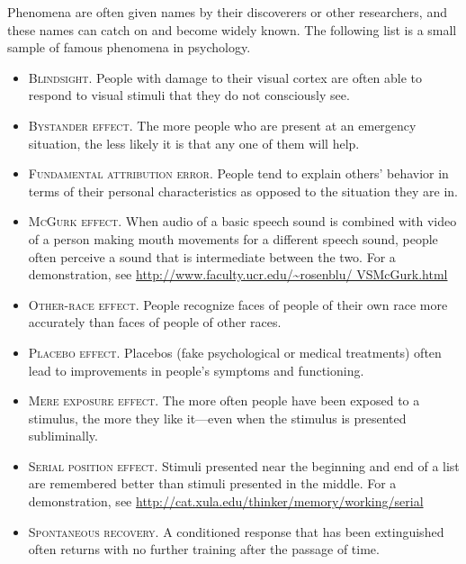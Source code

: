  Phenomena are often given names by their discoverers or other researchers, and these names can catch on and become widely known. The following list is a small sample of famous phenomena in psychology.
 \begin{itemize}
 \item \textsc{Blindsight}. People with damage to their visual cortex are often able to respond to visual stimuli that they do not consciously see.
 \item \textsc{Bystander effect}. The more people who are present at an emergency situation, the less likely it is that any one of them will help.
 \item \textsc{Fundamental attribution error}. People tend to explain others' behavior in terms of their personal characteristics as opposed to the situation they are in.
 \item \textsc{McGurk effect}. When audio of a basic speech sound is combined with video of a person making mouth movements for a different speech sound, people often perceive a sound that is intermediate between the two. For a demonstration, see \url{http://www.faculty.ucr.edu/~rosenblu/ VSMcGurk.html}
 \item \textsc{Other-race effect}. People recognize faces of people of their own race more accurately than faces of people of other races.
 \item \textsc{Placebo effect}. Placebos (fake psychological or medical treatments) often lead to improvements in people's symptoms and functioning.
 
 \item \textsc{Mere exposure effect}. The more often people have been exposed to a stimulus, the more they like it---even when the stimulus is presented subliminally.
 \item \textsc{Serial position effect}. Stimuli presented near the beginning and end of a list are remembered better than stimuli presented in the middle. For a demonstration, see \url{http://cat.xula.edu/thinker/memory/working/serial}
 \item \textsc{Spontaneous recovery}. A conditioned response that has been extinguished often returns with no further training after the passage of time.
 \end{itemize}
 
